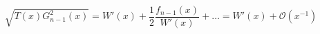 \begin{equation}
\sqrt{T(x) G_{n-1}^2(x)} = W'(x) + \frac{1}{2} \frac{f_{n-1}(x)}{W'(x)} + \ldots = W'(x) + \mathcal{O}(x^{-1})
\end{equation}

